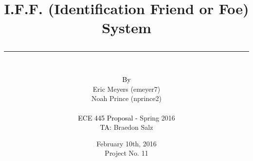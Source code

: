 \documentclass[openbib,letterpaper,10pt]{article}
\author{\vspace{.4in}\\
	\textcolor{black}{By}\\
	#1
	\vspace{1in}\\
	\textcolor{black}{ECE 445 Proposal -} #2\\
	\textcolor{black}{TA:} #3
	\vspace{1in}}
\newcommand{\thetitle}[1]{\title{\begin{huge}{\bf #1}\end{huge} \color{subtitlecolor}\rule[25pt]{\textwidth}{1pt}}}
\newcommand{\theauthor}[3]{
	\author{\vspace{.4in}\\
	\textcolor{black}{By}\\
	#1
	\vspace{1in}\\
	\textcolor{black}{ECE 445 Proposal -} #2\\
	\textcolor{black}{TA:} #3
	\vspace{1in}}
}
\begin{document}
\pagestyle{empty}
\doublespacing

\thetitle{{I.F.F. (Identification Friend or Foe) System}}

\theauthor{
	{Eric Meyers (emeyer7)}\\
	{Noah Prince (nprince2)}\\
}
{ %
	{Spring 2016}
}
{ %
	{Braedon Salz}
}

\date{
{February 10th, 2016}\\
Project No. 11
\clearpage
}
\end{document}
